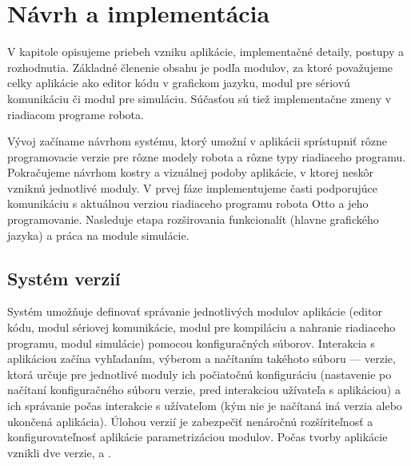 

\chapter{Návrh a implementácia}
\label{kap:implementacia}

V kapitole opisujeme priebeh vzniku aplikácie, implementačné detaily, postupy a rozhodnutia. Základné členenie obsahu je podľa modulov, za ktoré považujeme celky aplikácie ako editor kódu v grafickom jazyku, modul pre sériovú komunikáciu či modul pre simuláciu. Súčasťou sú tiež implementačne zmeny v riadiacom programe robota.

Vývoj začíname návrhom systému, ktorý umožní v aplikácii sprístupniť rôzne programovacie verzie pre rôzne modely robota a rôzne typy riadiaceho programu. Pokračujeme návrhom kostry a vizuálnej podoby aplikácie, v ktorej neskôr vzniknú jednotlivé moduly. V prvej fáze implementujeme časti podporujúce komunikáciu s aktuálnou verziou riadiaceho programu robota Otto a jeho programovanie. Nasleduje etapa rozširovania funkcionalít (hlavne grafického jazyka) a práca na module simulácie.




\section{Systém verzií}
\label{sec:system-verzii}
Systém umožňuje definovať správanie jednotlivých modulov aplikácie (editor kódu, modul sériovej komunikácie, modul pre kompiláciu a nahranie riadiaceho programu, modul simulácie) pomocou konfiguračných súborov. Interakcia s aplikáciou začína vyhľadaním, výberom a načítaním takéhoto súboru --- verzie, ktorá určuje pre jednotlivé moduly ich počiatočnú konfiguráciu (nastavenie po načítaní konfiguračného súboru verzie, pred interakciou užívateľa s aplikáciou) a ich správanie počas interakcie s užívateľom (kým nie je načítaná iná verzia alebo ukončená aplikácia). Úlohou verzií je zabezpečiť nenáročnú rozšíriteľnosť a konfigurovateľnosť aplikácie parametrizáciou modulov. Počas tvorby aplikácie vznikli dve verzie,  a .

